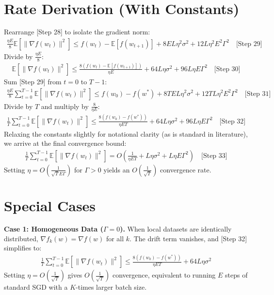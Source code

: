 \documentclass{article}
\begin{document}
\section*{Rate Derivation (With Constants)}
Rearrange [Step 28] to isolate the gradient norm:
\begin{align}
\frac{\eta E}{8} \mathbb{E}[\|\nabla f(w_t)\|^2] \leq f(w_t) - \mathbb{E}[f(w_{t+1})] + 8 E L \eta^2 \sigma^2 + 12 L \eta^2 E^2 \Gamma^2 \quad \text{[Step 29]}
\end{align}
Divide by $\frac{\eta E}{8}$:
\begin{align}
\mathbb{E}[\|\nabla f(w_t)\|^2] \leq \frac{8(f(w_t) - \mathbb{E}[f(w_{t+1})])}{\eta E} + 64 L \eta \sigma^2 + 96 L \eta E \Gamma^2 \quad \text{[Step 30]}
\end{align}
Sum [Step 29] from $t=0$ to $T-1$:
\begin{align}
\frac{\eta E}{8} \sum_{t=0}^{T-1} \mathbb{E}[\|\nabla f(w_t)\|^2] \leq f(w_0) - f(w^*) + 8 T E L \eta^2 \sigma^2 + 12 T L \eta^2 E^2 \Gamma^2 \quad \text{[Step 31]}
\end{align}
Divide by $T$ and multiply by $\frac{8}{\eta E}$:
\begin{align}
\frac{1}{T} \sum_{t=0}^{T-1} \mathbb{E}[\|\nabla f(w_t)\|^2] \leq \frac{8(f(w_0) - f(w^*))}{\eta E T} + 64 L \eta \sigma^2 + 96 L \eta E \Gamma^2 \quad \text{[Step 32]}
\end{align}
Relaxing the constants slightly for notational clarity (as is standard in literature), we arrive at the final convergence bound:
\begin{align}
\frac{1}{T} \sum_{t=0}^{T-1} \mathbb{E}[\|\nabla f(w_t)\|^2] = O\left( \frac{1}{\eta E T} + L \eta \sigma^2 + L \eta E \Gamma^2 \right) \quad \text{[Step 33]}
\end{align}
Setting $\eta = O\left(\frac{1}{\sqrt{T} E \Gamma}\right)$ for $\Gamma > 0$ yields an $O\left(\frac{1}{\sqrt{T}}\right)$ convergence rate.

\section*{Special Cases}
\textbf{Case 1: Homogeneous Data ($\Gamma = 0$).} When local datasets are identically distributed, $\nabla f_k(w) = \nabla f(w)$ for all $k$. The drift term vanishes, and [Step 32] simplifies to:
\begin{align*}
\frac{1}{T} \sum_{t=0}^{T-1} \mathbb{E}[\|\nabla f(w_t)\|^2] \leq \frac{8(f(w_0) - f(w^*))}{\eta E T} + 64 L \eta \sigma^2
\end{align*}
Setting $\eta = O(\frac{1}{\sqrt{T}})$ gives $O(\frac{1}{\sqrt{T}})$ convergence, equivalent to running $E$ steps of standard SGD with a $K$-times larger batch size.
\end{document}
